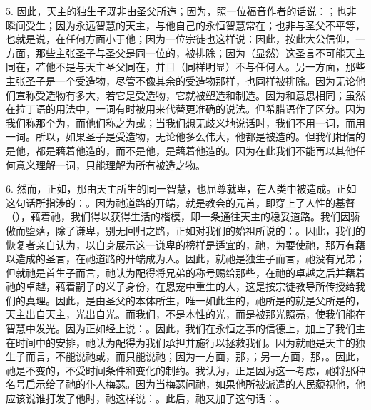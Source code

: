 5. 因此，天主的独生子既非由圣父所造；因为，照一位福音作者的话说：；也非瞬间受生；因为永远智慧的天主，与他自己的永恒智慧常在；也非与圣父不平等，也就是说，在任何方面小于他；因为一位宗徒也这样说：因此，按此大公信仰，一方面，那些主张圣子与圣父是同一位的，被排除；因为（显然）这圣言不可能天主同在，若他不是与天主圣父同在，并且（同样明显）不与任何人。另一方面，那些主张圣子是一个受造物，尽管不像其余的受造物那样，也同样被排除。因为无论他们宣称受造物有多大，若它是受造物，它就被塑造和制造。因为和意思相同；虽然在拉丁语的用法中，一词有时被用来代替更准确的说法。但希腊语作了区分。因为我们称那个为，而他们称之为或；当我们想无歧义地说话时，我们不用一词，而用一词。所以，如果圣子是受造物，无论他多么伟大，他都是被造的。但我们相信的是他，都是藉着他造的，而不是他，是藉着他造的。因为在此我们不能再以其他任何意义理解一词，只能理解为所有被造之物。\par

6. 然而，正如，那由天主所生的同一智慧，也屈尊就卑，在人类中被造成。正如这句话所指涉的：。因为祂道路的开端，就是教会的元首，即穿上了人性的基督（），藉着祂，我们得以获得生活的楷模，即一条通往天主的稳妥道路。我们因骄傲而堕落，除了谦卑，别无回归之路，正如对我们的始祖所说的：。因此，我们的恢复者亲自认为，以自身展示这一谦卑的榜样是适宜的，祂，为要使祂，那万有藉以造成的圣言，在祂道路的开端成为人。因此，就祂是独生子而言，祂没有兄弟；但就祂是首生子而言，祂认为配得将兄弟的称号赐给那些，在祂的卓越之后并藉着祂的卓越，藉着嗣子的义子身份，在恩宠中重生的人，这是按宗徒教导所传授给我们的真理。因此，是由圣父的本体所生，唯一如此生的，祂所是的就是父所是的，天主出自天主，光出自光。而我们，不是本性的光，而是被那光照亮，使我们能在智慧中发光。因为正如经上说：。因此，我们在永恒之事的信德上，加上了我们主在时间中的安排，祂认为配得为我们承担并施行以拯救我们。因为就祂是天主的独生子而言，不能说祂或，而只能说祂；因为一方面，那，；另一方面，那，。因此，祂是不变的，不受时间条件和变化的制约。我认为，正是因为这一考虑，祂将那种名号启示给了祂的仆人梅瑟。因为当梅瑟问祂，如果他所被派遣的人民藐视他，他应该说谁打发了他时，祂这样说：。此后，祂又加了这句话：。\par

